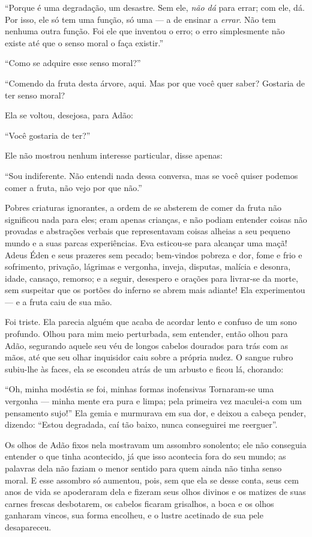 ``Porque é uma degradação, um desastre. Sem ele, \textit{não
dá} para errar; com ele, dá. Por isso, ele só tem uma
função, só uma --- a de ensinar a \textit{errar}.
Não tem nenhuma outra função. Foi ele que inventou o erro; o erro simplesmente não
existe até que o senso moral o faça existir.''

``Como se adquire esse senso moral?''

``Comendo da fruta desta árvore, aqui. Mas por que você quer
saber? Gostaria de ter senso moral?

Ela se voltou, desejosa, para Adão:

``Você gostaria de ter?''

Ele não mostrou nenhum interesse particular, disse apenas:

``Sou indiferente. Não entendi nada dessa conversa, mas se
você quiser podemos comer a fruta, não vejo por que não.''

Pobres criaturas ignorantes, a ordem de se absterem de
comer da fruta não significou nada para eles; eram apenas crianças, e não
podiam entender coisas não provadas e abstrações verbais que representavam
coisas alheias a seu pequeno mundo e a suas parcas experiências. Eva
esticou-se para alcançar uma maçã! Adeus Éden e seus prazeres sem pecado;
bem-vindos pobreza e dor, fome e frio e sofrimento, privação, lágrimas e
vergonha, inveja, disputas, malícia e desonra, idade, cansaço, remorso; e
a seguir, desespero e orações para livrar-se da morte,
sem suspeitar que os portões do inferno se abrem mais
adiante! Ela experimentou --- e a fruta caiu de sua mão.

Foi triste. Ela parecia alguém que acaba de acordar lento e
confuso de um sono profundo. Olhou para mim meio perturbada, sem
entender, então olhou para Adão, segurando aquele seu véu de longos cabelos
dourados para trás com as mãos, até que seu olhar inquisidor caiu sobre
a própria nudez. O sangue rubro subiu-lhe às faces, ela se escondeu atrás
de um arbusto e ficou lá, chorando:

``Oh, minha modéstia se foi, minhas formas inofensivas
Tornaram-se uma vergonha --- minha mente era pura e limpa; pela primeira vez
maculei-a com um pensamento sujo!'' Ela gemia e murmurava em
sua dor, e deixou a cabeça pender, dizendo: ``Estou
degradada, caí tão baixo, nunca conseguirei me reerguer''.

Os olhos de Adão fixos nela mostravam um assombro sonolento; ele não
conseguia entender o que tinha acontecido, já que isso acontecia fora do
seu mundo; as palavras dela não faziam o menor sentido para quem ainda
não tinha senso moral. E esse assombro só aumentou, pois, sem que ela
se desse conta, seus cem anos de vida
se apoderaram dela e fizeram seus olhos divinos e os matizes de
suas carnes frescas desbotarem,
os cabelos ficaram grisalhos, a boca e os olhos ganharam vincos,
sua forma encolheu, e o lustre acetinado de sua pele
desapareceu.

